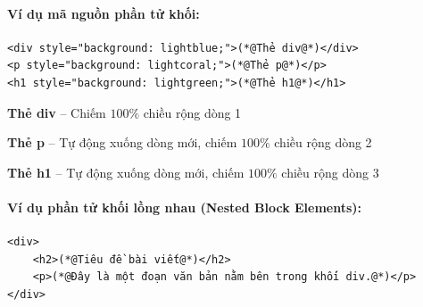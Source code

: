 \documentclass[11pt,oneside]{book}
\begin{document}
\paragraph{Ví dụ mã nguồn phần tử khối:}
\begin{codeWindow}
\begin{lstlisting}[language=HTML5]
<div style="background: lightblue;">(*@Thẻ div@*)</div>
<p style="background: lightcoral;">(*@Thẻ p@*)</p>
<h1 style="background: lightgreen;">(*@Thẻ h1@*)</h1>
\end{lstlisting}
\end{codeWindow}

\begin{browserWindow}
\begin{tcolorbox}[enhanced, colback=blue!10, colframe=blue!40, arc=4pt, boxrule=0.6pt, top=4pt, bottom=4pt, left=8pt, right=8pt, before=\par\vspace{3pt}, after=\par\vspace{3pt}]
\sffamily\small\textbf{Thẻ div} -- Chiếm $100\%$ chiều rộng dòng 1
\end{tcolorbox}
\begin{tcolorbox}[enhanced, colback=red!10, colframe=red!40, arc=4pt, boxrule=0.6pt, top=4pt, bottom=4pt, left=8pt, right=8pt, before=\par\vspace{3pt}, after=\par\vspace{3pt}]
\sffamily\small\textbf{Thẻ p} -- Tự động xuống dòng mới, chiếm $100\%$ chiều rộng dòng 2
\end{tcolorbox}
\begin{tcolorbox}[enhanced, colback=green!10, colframe=green!40, arc=4pt, boxrule=0.6pt, top=4pt, bottom=4pt, left=8pt, right=8pt, before=\par\vspace{3pt}, after=\par\vspace{3pt}]
\sffamily\small\textbf{Thẻ h1} -- Tự động xuống dòng mới, chiếm $100\%$ chiều rộng dòng 3
\end{tcolorbox}
\end{browserWindow}

\paragraph{Ví dụ phần tử khối lồng nhau (Nested Block Elements):}
\begin{codeWindow}
\begin{lstlisting}[language=HTML5]
<div>
    <h2>(*@Tiêu đề bài viết@*)</h2>
    <p>(*@Đây là một đoạn văn bản nằm bên trong khối div.@*)</p>
</div>
\end{lstlisting}
\end{codeWindow}
\end{document}
